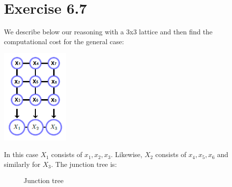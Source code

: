 \documentclass[11pt,a4paper,oneside]{report}
\begin{document}
\section*{Exercise 6.7}

We describe below our reasoning with a 3x3 lattice and then find the computational cost for the general case:

\begin{center} \includegraphics[width=0.25\textwidth]{c6e7temp}\end{center}  

In this case $X_1$ consists of $x_1,x_2,x_3$. Likewise, $X_2$ consists of $x_4,x_5,x_6$ and similarly for $X_3$. The junction tree is:



\begin{figure}[H]
  \centering
  \caption{Junction tree}
\end{figure}
	
\end{document}
